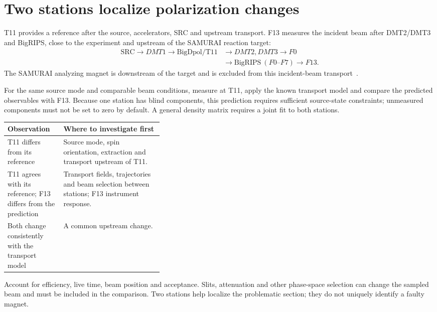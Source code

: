 \documentclass[11pt,a4paper]{article}
\begin{document}
\section{Two stations localize polarization changes}

T11 provides a reference after the source, accelerators, SRC and upstream transport. F13 measures the incident beam after DMT2/DMT3 and BigRIPS, close to the experiment and upstream of the SAMURAI reaction target:
\begin{equation*}
\begin{aligned}
\mathrm{SRC}\to DMT1\to\boxed{\mathrm{BigDpol/T11}}
&\to DMT2,DMT3\to F0\\[-1pt]
&\to\mathrm{BigRIPS}\ (F0\text{--}F7)\to\boxed{F13}.
\end{aligned}
\end{equation*}
The SAMURAI analyzing magnet is downstream of the target and is excluded from this incident-beam transport~\cite{local,geometry}.

For the same source mode and comparable beam conditions, measure at T11, apply the known transport model and compare the predicted observables with F13. Because one station has blind components, this prediction requires sufficient source-state constraints; unmeasured components must not be set to zero by default. A general density matrix requires a joint fit to both stations.

\noindent\begin{minipage}{\linewidth}
\begingroup\small\noindent
\begin{tabularx}{\linewidth}{@{}p{0.36\linewidth}Y@{}}
\toprule
Observation & Where to investigate first \\
\midrule
T11 differs from its reference & Source mode, spin orientation, extraction and transport upstream of T11.\\
T11 agrees with its reference; F13 differs from the prediction & Transport fields, trajectories and beam selection between stations; F13 instrument response.\\
Both change consistently with the transport model & A common upstream change.\\
\bottomrule
\end{tabularx}\par
\endgroup
\vspace{4pt}

Account for efficiency, live time, beam position and acceptance. Slits, attenuation and other phase-space selection can change the sampled beam and must be included in the comparison. Two stations help localize the problematic section; they do not uniquely identify a faulty magnet.
\end{minipage}\par\vspace{1ex}
\end{document}
